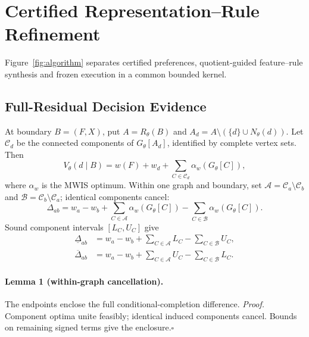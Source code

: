 \section{Certified Representation--Rule Refinement}
\label{sec:method}
Figure~\ref{fig:algorithm} separates certified preferences, quotient-guided
feature--rule synthesis and frozen execution in a common bounded kernel.

\subsection{Full-Residual Decision Evidence}
\label{sec:method:certificates}
At boundary $B=(F,X)$, put $A=R_\theta(B)$ and
$A_d=A\setminus(\{d\}\cup N_\theta(d))$. Let $\mathcal C_d$ be the connected
components of $G_\theta[A_d]$, identified by complete vertex sets. Then
\begin{equation}
 V_\theta(d\mid B)=w(F)+w_d+
             \sum_{C\in\mathcal C_d}\alpha_w(G_\theta[C]),
 \label{eq:component-completion}
\end{equation}
where $\alpha_w$ is the MWIS optimum. Within one graph and boundary, set
$\mathcal A=\mathcal C_a\setminus\mathcal C_b$ and
$\mathcal B=\mathcal C_b\setminus\mathcal C_a$; identical components cancel:
\begin{equation}
 \Delta_{ab}=w_a-w_b+\sum_{C\in\mathcal A}\alpha_w(G_\theta[C])
                        -\sum_{C\in\mathcal B}\alpha_w(G_\theta[C]).
 \label{eq:cancelled-difference}
\end{equation}
Sound component intervals $[L_C,U_C]$ give
\begin{equation}
 \begin{split}
 \underline\Delta_{ab}&=w_a-w_b+\sum_{C\in\mathcal A}L_C-\sum_{C\in\mathcal B}U_C,\\
 \overline\Delta_{ab}&=w_a-w_b+\sum_{C\in\mathcal A}U_C-\sum_{C\in\mathcal B}L_C.
 \end{split}
 \label{eq:difference-envelope}
\end{equation}
\paragraph{Lemma 1 (within-graph cancellation).}
The endpoints enclose the full conditional-completion difference.
\emph{Proof.} Component optima unite feasibly; identical induced components
cancel. Bounds on remaining signed terms give the enclosure.\hfill$\square$

